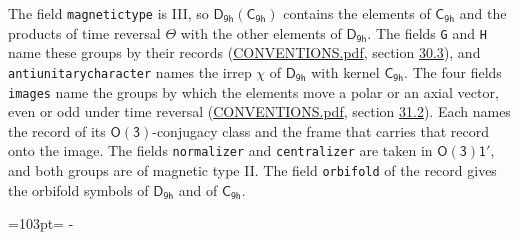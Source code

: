 \documentclass[10pt,a4paper]{article}
\newcommand{\needspace}[1]{\par\penalty-100\begingroup\dimen0=#1\relax\dimen2=\pagegoal
  \advance\dimen2-\pagetotal\ifdim\dimen0>\dimen2\relax\ifdim\dimen2>0pt\vfil\break\fi\fi
  \endgroup}
\numberwithin{equation}{section}
\newcommand{\grp}[1]{\mathsf{#1}}
\begin{document}
The field \texttt{magnetictype} is III, so $\grp{D_{9h}}(\grp{C_{9h}})$ contains the elements of $\grp{C_{9h}}$ and the products of time reversal $\varTheta$ with the other elements of $\grp{D_{9h}}$. The fields \texttt{G} and \texttt{H} name these groups by their records (\href{../../CONVENTIONS.pdf}{CONVENTIONS.pdf}, section \href{../../CONVENTIONS.pdf\#conv.30.3}{30.3}), and \texttt{antiunitarycharacter} names the irrep $\chi$ of $\grp{D_{9h}}$ with kernel $\grp{C_{9h}}$. The four fields \texttt{images} name the groups by which the elements move a polar or an axial vector, even or odd under time reversal (\href{../../CONVENTIONS.pdf}{CONVENTIONS.pdf}, section \href{../../CONVENTIONS.pdf\#conv.31.2}{31.2}). Each names the record of its $\grp{O(3)}$-conjugacy class and the frame that carries that record onto the image. The fields \texttt{normalizer} and \texttt{centralizer} are taken in $\grp{O(3)1'}$, and both groups are of magnetic type II. The field \texttt{orbifold} of the record gives the orbifold symbols of $\grp{D_{9h}}$ and of $\grp{C_{9h}}$.
\needspace{103pt}
\end{document}
